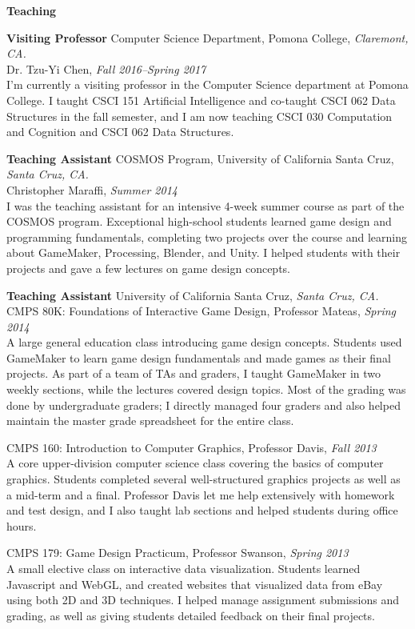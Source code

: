 \documentclass[11pt]{article}
\newenvironment{sct}[1]{%
  \vspace{8pt}\textbf{\Large #1} \hrulefill\vspace{6pt}
  \begin{adjustwidth}{6pt}{0pt}
}{%
  \end{adjustwidth}
}
\newcommand{\experience}[6]{%
  \textbf{#1} #2, \textit{#3.} \\
  #4, \textit{#5} \vspace{6pt} \\
  #6 \vspace{8pt}
}
\newcommand{\combexp}[4]{%
  \textbf{#1} #2, \textit{#3.} \\
  #4 \vspace{8pt}
}
\begin{document}
\begin{sct}{Teaching}

\experience{Visiting Professor}{Computer Science Department, Pomona College}{Claremont, CA}%
{Dr. Tzu-Yi Chen}{Fall 2016--Spring 2017}{
I’m currently a visiting professor in the Computer Science department at Pomona
College. I taught CSCI 151 Artificial Intelligence and co-taught CSCI 062 Data
Structures in the fall semester, and I am now teaching CSCI 030 Computation and
Cognition and CSCI 062 Data Structures.
}

\experience{Teaching Assistant}{COSMOS Program, University of California Santa Cruz}{Santa Cruz, CA}%
{Christopher Maraffi}{Summer 2014}{
I was the teaching assistant for an intensive 4-week summer course as part of
the COSMOS program. Exceptional high-school students learned game design and
programming fundamentals, completing two projects over the course and learning
about GameMaker, Processing, Blender, and Unity. I helped students with their
projects and gave a few lectures on game design concepts.
}

\newpage

\combexp{Teaching Assistant}{University of California Santa Cruz}{Santa Cruz, CA}%
{
CMPS 80K: Foundations of Interactive Game Design, Professor Mateas, \textit{Spring 2014} \vspace{2pt} \\
A large general education class introducing game design concepts. Students used
GameMaker to learn game design fundamentals and made games as their final
projects. As part of a team of TAs and graders, I taught GameMaker in two
weekly sections, while the lectures covered design topics. Most of the grading
was done by undergraduate graders; I directly managed four graders and also
helped maintain the master grade spreadsheet for the entire class.
\vspace{6pt}

CMPS 160: Introduction to Computer Graphics, Professor Davis, \textit{Fall 2013} \vspace{2pt} \\
A core upper-division computer science class covering the basics of computer
graphics. Students completed several well-structured graphics projects as well
as a mid-term and a final. Professor Davis let me help extensively with
homework and test design, and I also taught lab sections and helped students
during office hours.
\vspace{6pt}

CMPS 179: Game Design Practicum, Professor Swanson, \textit{Spring 2013} \vspace{2pt} \\
A small elective class on interactive data visualization. Students learned
Javascript and WebGL, and created websites that visualized data from eBay using
both 2D and 3D techniques. I helped manage assignment submissions and grading,
as well as giving students detailed feedback on their final projects.\vspace{6pt}

}
\end{sct}
\end{document}
